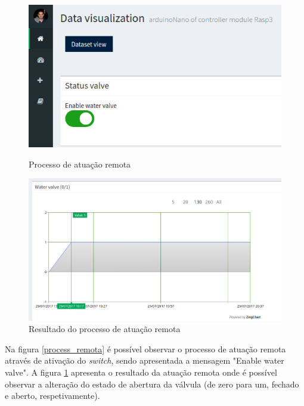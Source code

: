 \begin{figure}[h]
	\centering
	\begin{minipage}[b]{0.495\textwidth}
		\centering
		\includegraphics[width=\textwidth]{prints-web/onstatus.png}
		\caption[Processo de atuação remota]{Processo de atuação remota \newline}
		\label{process_remota}
	\end{minipage}
	\hfill
	\begin{minipage}[b]{0.495\textwidth}
		\centering
		\includegraphics[width=\textwidth]{prints-web/viewstatus.png}
		\caption{Resultado do processo de atuação remota}
		\label{resutl_remota}
	\end{minipage}
\end{figure}


Na figura \ref{process_remota} é possível observar o processo de atuação remota através de ativação do \textit{switch}, sendo apresentada a mensagem "Enable water valve". A figura \ref{resutl_remota} apresenta o resultado da atuação remota onde é possível observar a alteração do estado de abertura da válvula (de zero para um, fechado e aberto, respetivamente).  

